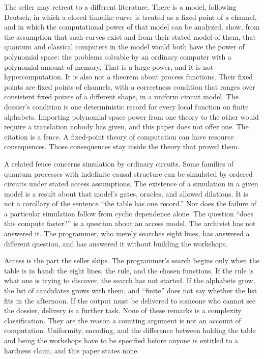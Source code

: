 \documentclass[11pt]{article}
\begin{document}
The seller may retreat to a different literature. There is a model, following Deutsch, in which a closed timelike curve is treated as a fixed point of a channel, and in which the computational power of that model can be analyzed. \citet{aaronson2008} show, from the assumption that such curves exist and from their stated model of them, that quantum and classical computers in the model would both have the power of polynomial space: the problems solvable by an ordinary computer with a polynomial amount of memory. That is a large power, and it is not hypercomputation. It is also not a theorem about process functions. Their fixed points are fixed points of channels, with a correctness condition that ranges over consistent fixed points of a different shape, in a uniform circuit model. The dossier’s condition is one deterministic record for every local function on finite alphabets. Importing polynomial-space power from one theory to the other would require a translation nobody has given, and this paper does not offer one. The citation is a fence. A fixed-point theory of computation can have resource consequences. Those consequences stay inside the theory that proved them.

A related fence concerns simulation by ordinary circuits. Some families of quantum processes with indefinite causal structure can be simulated by ordered circuits under stated access assumptions. The existence of a simulation in a given model is a result about that model’s gates, oracles, and allowed dilations. It is not a corollary of the sentence ``the table has one record.'' Nor does the failure of a particular simulation follow from cyclic dependence alone. The question ``does this compute faster?'' is a question about an access model. The archivist has not answered it. The programmer, who merely searches eight lines, has answered a different question, and has answered it without building the workshops.

Access is the part the seller skips. The programmer’s search begins only when the table is in hand: the eight lines, the rule, and the chosen functions. If the rule is what one is trying to discover, the search has not started. If the alphabets grow, the list of candidates grows with them, and “finite” does not say whether the list fits in the afternoon. If the output must be delivered to someone who cannot see the dossier, delivery is a further task. None of these remarks is a complexity classification. They are the reason a counting argument is not an account of computation. Uniformity, encoding, and the difference between holding the table and being the workshops have to be specified before anyone is entitled to a hardness claim, and this paper states none.
\end{document}
